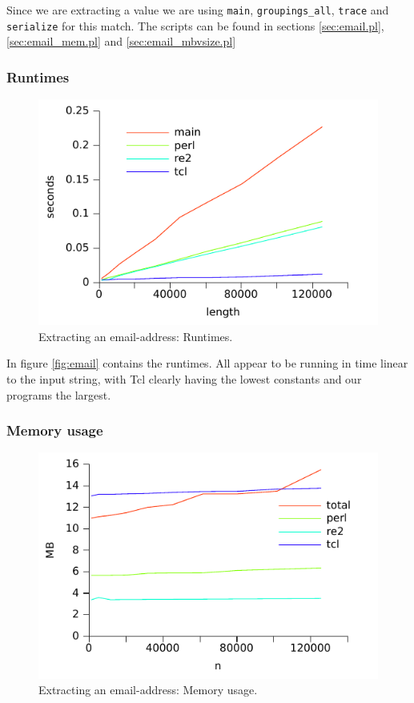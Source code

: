 Since we are extracting a value we are using \texttt{main},
\texttt{groupings\_all}, \texttt{trace} and \texttt{serialize} for
this match. The scripts can be found in sections \vref{sec:email.pl},
\vref{sec:email_mem.pl} and \vref{sec:email_mbvsize.pl}

\subsubsection*{Runtimes}

\begin{figure}
\centering
\includegraphics{benchmarks/email.pdf}
\caption{Extracting an email-address: Runtimes.}
\label{fig:email}
\end{figure}

In figure \vref{fig:email} contains the runtimes. All appear to be
running in time linear to the input string, with Tcl clearly having
the lowest constants and our programs the largest. 


\subsubsection*{Memory usage}
\begin{figure}
\centering
\includegraphics{benchmarks/memory/email_mem.pdf}
\caption{Extracting an email-address: Memory usage.}
\label{fig:email_mem}
\end{figure}

